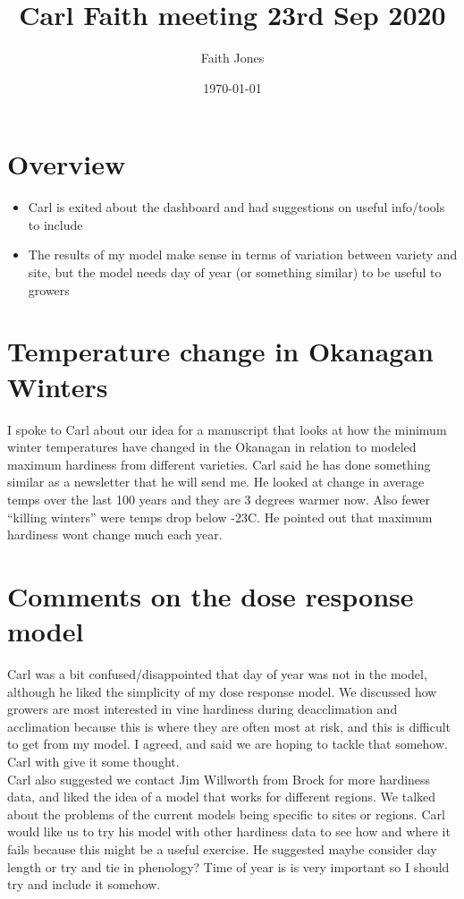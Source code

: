 \documentclass[11pt,letter]{article}
\title{Carl Faith meeting 23rd Sep 2020}
\date{\today}
\author{Faith Jones}
\begin{document}
\renewcommand{\bibname}{References}%

\section{Overview}
\begin{itemize}
	\item Carl is exited about the dashboard and had suggestions on useful info/tools to include
	\item The results of my model make sense in terms of variation between variety and site, but the model needs day of year (or something similar) to be useful to growers
\end{itemize}

\section{Temperature change in Okanagan Winters}

I spoke to Carl about our idea for a manuscript that looks at how the minimum winter temperatures have changed in the Okanagan in relation to modeled maximum hardiness from different varieties. Carl said he has done something similar as a newsletter that he will send me. He looked at change in average temps over the last 100 years and they are 3 degrees warmer now. Also fewer ``killing winters'' were temps drop below -23\textdegree C. He pointed out that maximum hardiness wont change much each year. \\

\section{Comments on the dose response model}

Carl was a bit confused/disappointed that day of year was not in the model, although he liked the simplicity of my dose response model. We discussed how growers are most interested in vine hardiness during deacclimation and acclimation because this is where they are often most at risk, and this is difficult to get from my model. I agreed, and said we are hoping to tackle that somehow. Carl with give it some thought. \\

Carl also suggested we contact Jim Willworth from Brock for more hardiness data, and liked the idea of a model that works for different regions. We talked about the problems of the current models being specific to sites or regions. Carl would like us to try his model with other hardiness data to see how and where it fails because this might be a useful exercise. He suggested maybe consider day length or try and tie in phenology? Time of year is is very important so I should try and include it somehow. \\
\end{document}
